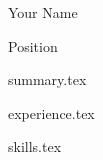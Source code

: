 \documentclass[12pt, a4paper]{extarticle}
\begin{document}
	{
	
	\setlength{\parskip}{1ex plus .2ex}

	\par {\Huge Your Name}
	\par {\Large Position}

	}

	{summary.tex}

	{experience.tex}

	{skills.tex}
\end{document}
